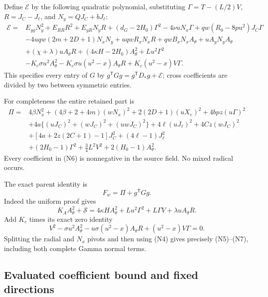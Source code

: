 Define $\mathcal E$ by the following quadratic polynomial, substituting
$\Gamma=T-(L/2)V$, $R=J_C-J_\ell$, and $N_y=QJ_C+bJ_\ell$:
\[
\begin{split}
 \mathcal E={}&E_{yy}N_y^2+E_{RR}R^2+E_{yR}N_yR
 +(d_G-2H_0)\Gamma^2-4\nu uN_x\Gamma
 +qw(R_0-8pu^2)J_C\Gamma\\
 &-4uqw(2m+2D+1)N_xN_y+uqwR_xN_xR
 +qwB_xN_xA_\theta+uA_yN_yA_\theta\\
 &+(\chi+\lambda)uA_\theta R
 +(4\kappa H-2H_0)A_\theta^2+Lu^2\Gamma^2\\
 &-K_c\sigma u^2 A_\theta^2
 -K_c\sigma u(u^2-x)A_\theta R
 +K_c(u^2-x)V\Gamma .
\end{split}                                                    \tag{N5}
\]
This specifies every entry of $G$ by
$g^{\mathsf T}Gg=g^{\mathsf T}D_*g+\mathcal E$; cross coefficients
are divided by two between symmetric entries.

For completeness the entire retained part is
\[
\begin{split}
 \Pi={}&4\beta N_x^2+(4\beta+2+4m)(wN_x)^2
 +2(2D+1)(uX_e)^2+4bpz(u\Gamma)^2\\
 &+4a\{(uJ_C)^2+(wJ_C)^2+(uwJ_C)^2\}
 +4\ell(uJ_\ell)^2+4Cz(wJ_C)^2\\
 &+[4a+2z(2C+1)-1]J_C^2+(4\ell-1)J_\ell^2\\
 &+(2H_0-1)\Gamma^2+\tfrac34L^2V^2
 +2(H_0-1)A_\theta^2.
\end{split}                                                    \tag{N6}
\]
Every coefficient in (N6) is nonnegative in the source field.
No mixed radical occurs.

The exact parent identity is
\[
                     F_w=\Pi+g^{\mathsf T}Gg.             \tag{N7}
\]
Indeed the uniform proof gives
\[
 K_AA_\theta^2+\mathscr S
 =4\kappa H A_\theta^2+Lu^2\Gamma^2+L\Gamma V
                                      +\lambda uA_\theta R.
\]
Add $K_c$ times its exact zero identity
\[
 V^2-\sigma u^2A_\theta^2
 -u\sigma(u^2-x)A_\theta R+(u^2-x)V\Gamma=0.
\]
Splitting the radial and $N_x$ pivots and then using (N4) gives
precisely (N5)--(N7), including both complete Gamma normal terms.

\subsection{Evaluated coefficient bound and fixed directions}

